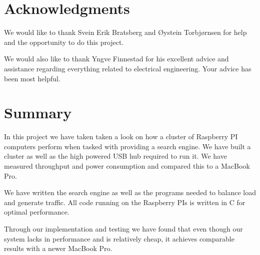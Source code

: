 \clearpage
\section{Acknowledgments}
We would like to thank Svein Erik Bratsberg and \O ystein Torbj\o rnsen for help and the opportunity to do this project.

We would also like to thank Yngve Finnestad for his excellent advice and assistance regarding everything related to electrical engineering. Your advice has been most helpful.

\section{Summary}
In this project we have taken taken a look on how a cluster of Raspberry PI computers perform when tasked with providing a search engine. We have built a cluster as well as the high powered USB hub required to run it. We have measured throughput and power consumption and compared this to a MacBook Pro.

We have written the search engine as well as the programs needed to balance load and generate traffic. All code running on the Raspberry PIs is written in C for optimal performance.

Through our implementation and testing we have found that even though our system lacks in performance and is relatively cheap, it achieves comparable results with a newer MacBook Pro. 


